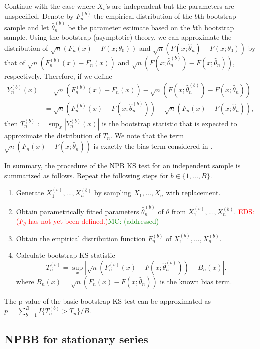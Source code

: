 \documentclass[APA,Times1COL]{WileyNJDv5} %
\newcommand{\eds}[1]{\textcolor{red}{EDS: (#1)}}
\newcommand{\mc}[1]{\textcolor{green}{MC: (#1)}}
\begin{document}
Continue with the case where $X_i$'s are independent but the parameters
are unspecified. Denote by
$F^{(b)}_n$ the empirical distribution of the $b$th bootstrap sample and let
$\hat\theta^{(b)}_n$ be the parameter estimate based on the $b$th bootstrap 
sample. 
Using the bootstrap (asymptotic) theory, we can approximate the distribution of
$\sqrt{n}(F_n(x) - F(x; \theta_0))$ and
$\sqrt{n}(F(x; \hat\theta_n) - F(x; \theta_0))$
by that of $\sqrt{n}(F^{(b)}_n(x) - F_n(x))$ and
$\sqrt{n}(F(x; \hat\theta^{(b)}_n) - F(x; \hat\theta_n))$, respectively.
Therefore, if we define
\begin{align*}
Y^{(b)}_n(x) &= \sqrt{n}(F^{(b)}_n(x) - F_n(x)) - 
               \sqrt{n}(F(x; \hat\theta^{(b)}_n) - F(x; \hat\theta_n)) \\
             &= \sqrt{n}(F^{(b)}_n(x) - F(x; \hat\theta^{(b)}_n)) - 
               \sqrt{n}(F_n(x) - F(x; \hat\theta_n)),
\end{align*}
then $T^{(b)}_n := \sup_x|Y^{(b)}_n(x)|$ is the bootstrap statistic that is 
expected to approximate the distribution of $T_n$. We note that the term
$\sqrt{n}(F_n(x) - F(x; \hat\theta_n))$ is exactly the bias term considered in 
\citet{babu2004goodness}.


In summary, the procedure of the NPB KS test for an independent sample is
summarized as follows. Repeat the following steps for $b \in \{1, ..., B\}$.
\begin{enumerate}
\item
  Generate $X^{(b)}_1,...,X^{(b)}_n$ by sampling $X_1, \ldots, X_n$
  with replacement.
\item
  Obtain parametrically
  fitted parameters 
	$\hat\theta^{(b)}_n$ of $\theta$ from $X^{(b)}_1,...,X^{(b)}_n$.  
	\eds{$F_\theta$ has not yet been defined.}\mc{addressed}
\item
  Obtain the empirical distribution function $F^{(b)}_n$ of
  $X^{(b)}_1,...,X^{(b)}_n$. 
\item
  Calculate bootstrap KS statistic
  \[
    T^{(b)}_n = \sup_x | \sqrt{n}\left(F^{(b)}_n(x) 
    - F(x; \hat\theta^{(b)}_n)\right) - B_n(x) |.
  \]
  where 
  $B_{n}(x) = \sqrt{n}(F_n(x) - F(x; \hat\theta_n))$ is the known
  bias term.
\end{enumerate}


The p-value of the basic bootstrap KS test can be approximated
as $p = \sum_{b=1}^B I\{T^{(b)}_n > T_n\} / B$.


\subsection{NPBB for stationary series}
\end{document}
